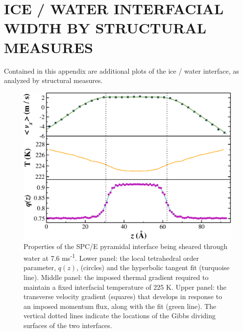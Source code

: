 \chapter{ICE / WATER INTERFACIAL WIDTH BY STRUCTURAL MEASURES}

Contained in this appendix are additional plots of the ice / water interface, as analyzed by structural measures.

\begin{figure}
\includegraphics[width=\linewidth]{Figures/Pyr_comic_strip}
\caption{\label{fig:pyrComic} Properties of the SPC/E pyramidal
  interface being sheared through water at 7.6
  ms\textsuperscript{-1}. Lower panel: the local tetrahedral order
  parameter, $q(z)$, (circles) and the hyperbolic tangent fit
  (turquoise line).  Middle panel: the imposed thermal gradient
  required to maintain a fixed interfacial temperature of 225 K. Upper
  panel: the transverse velocity gradient (squares) that develops in
  response to an imposed momentum flux, along with the fit (green
  line). The vertical dotted lines indicate the locations of the Gibbs
  dividing surfaces of the two interfaces.}
\end{figure}

